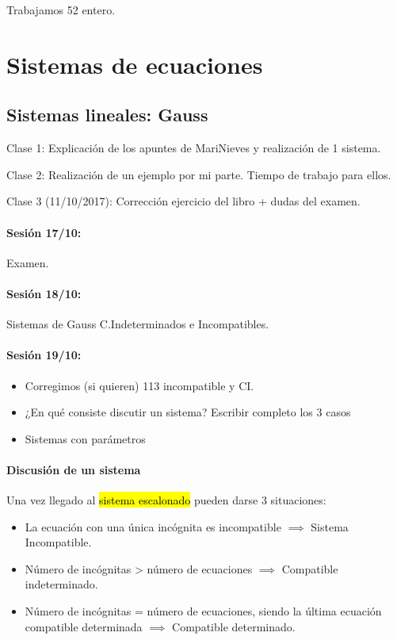 \documentclass[palatino,nosec]{Docencia}
\begin{document}
Trabajamos 52 entero.

\section{Sistemas de ecuaciones}

\subsection{Sistemas lineales: Gauss}


Clase 1: Explicación de los apuntes de MariNieves y realización de 1 sistema.

Clase 2: Realización de un ejemplo por mi parte. Tiempo de trabajo para ellos.

Clase 3 (11/10/2017): Corrección ejercicio del libro + dudas del examen. 

\paragraph{Sesión 17/10:} Examen.

\paragraph{Sesión 18/10:} Sistemas de Gauss C.Indeterminados e Incompatibles.

\paragraph{Sesión 19/10:} 
\begin{itemize}
	\item Corregimos (si quieren) 113 incompatible y CI.
	\item ¿En qué consiste discutir un sistema? Escribir completo los 3 casos
	\item Sistemas con parámetros
\end{itemize}

\paragraph{Discusión de un sistema}

Una vez llegado al \hl{sistema escalonado} pueden darse 3 situaciones:

\begin{itemize}
	\item La ecuación con una única incógnita es incompatible $\implies$ Sistema Incompatible.
	\item Número de incógnitas > número de ecuaciones $\implies$ Compatible indeterminado.
	\item Número de incógnitas = número de ecuaciones, siendo la última ecuación compatible determinada $\implies$ Compatible determinado.
\end{itemize}
\end{document}
